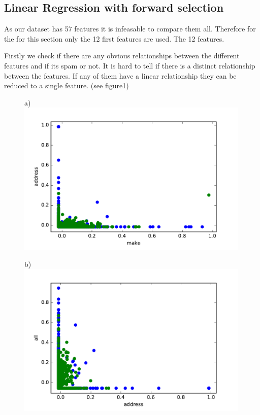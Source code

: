 \documentclass[10pt, paper=a4]{article}
\begin{document}
\subsection{Linear Regression with forward selection}
As our dataset has 57 features it is infeasable to compare them all.
Therefore for the for this section only the 12 first features are used.
The 12 features.

Firstly we check if there are any obvious relationships between the
different features and if its spam or not. It is hard to tell if there
is a distinct relationship between the features. If any of them have a
linear relationship they can be reduced to a single feature. (see figure1)

\begin{figure}[h]
  \begin{minipage}{0.3\textwidth}
    a)\\
    \includegraphics[width = 0.99\textwidth]{../../src/img/make_address.pdf}
  \end{minipage} \hfill
  \begin{minipage}{0.3\textwidth}
    b)\\
    \includegraphics[width = 0.99\textwidth]{../../src/img/address_all.pdf}

\end{minipage}
\end{figure}
\end{document}
